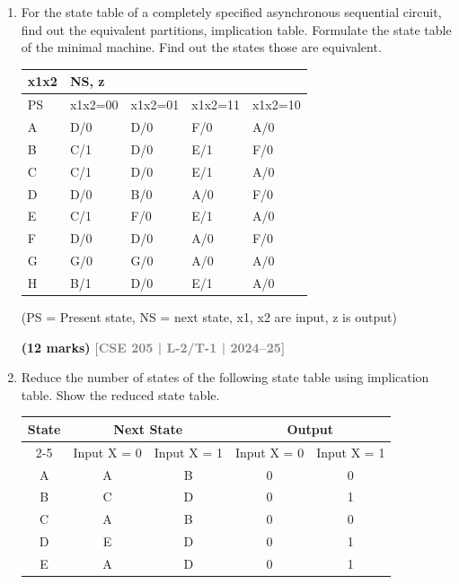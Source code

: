 \documentclass[12pt]{article}
\newcommand{\yr}[1]{\hfill\textcolor{gray}{\small\textbf{[#1]}}}
\newcommand{\mk}[1]{\textcolor{orange!70!black}{\small\textbf{(#1 marks)}}}
\begin{document}
\begin{enumerate}

\item For the state table of a completely specified asynchronous sequential circuit, find out the equivalent partitions, implication table. Formulate the state table of the minimal machine. Find out the states those are equivalent.

\begin{center}
  \begin{tabular}{|l|l|l|l|l|}
\hline
x1x2 & NS, z & & & \\ \hline
PS & x1x2=00 & x1x2=01 & x1x2=11 & x1x2=10 \\ \hline
A & D/0 & D/0 & F/0 & A/0 \\ \hline
B & C/1 & D/0 & E/1 & F/0 \\ \hline
C & C/1 & D/0 & E/1 & A/0 \\ \hline
D & D/0 & B/0 & A/0 & F/0 \\ \hline
E & C/1 & F/0 & E/1 & A/0 \\ \hline
F & D/0 & D/0 & A/0 & F/0 \\ \hline
G & G/0 & G/0 & A/0 & A/0 \\ \hline
H & B/1 & D/0 & E/1 & A/0 \\ \hline
\end{tabular}

\vspace{0.3cm}
(PS = Present state, NS = next state, x1, x2 are input, z is output)
\end{center}

\mk{12} \yr{CSE 205 | L-2/T-1 | 2024--25}


\item Reduce the number of states of the following state table using implication table. Show the reduced state table.

\begin{center}
  \begin{tabular}{|c|c|c|c|c|}
\hline
\multirow{2}{*}{State} & \multicolumn{2}{c|}{Next State} & \multicolumn{2}{c|}{Output} \\ \cline{2-5} 
                       & Input X = 0    & Input X = 1    & Input X = 0  & Input X = 1  \\ \hline
A                      & A              & B              & 0            & 0            \\ \hline
B                      & C              & D              & 0            & 1            \\ \hline
C                      & A              & B              & 0            & 0            \\ \hline
D                      & E              & D              & 0            & 1            \\ \hline
E                      & A              & D              & 0            & 1            \\ \hline
\end{tabular}
\end{center}


\end{enumerate}
\end{document}
